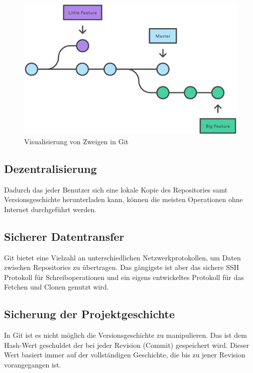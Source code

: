 \begin{figure}[!b]
	\begin{center}
		\includegraphics[width=16cm]{images/Git-Branches-1.png}
		\caption{Visualisierung von Zweigen in Git ~\cite{GitBranches}}
	\end{center}
\end{figure}
\newpage
\subsection*{Dezentralisierung}
Dadurch das jeder Benutzer sich eine lokale Kopie des Repositories samt Versionsgeschichte herunterladen kann, können die meisten Operationen ohne Internet durchgeführt werden. 

\subsection*{Sicherer Datentransfer}
Git bietet eine Vielzahl an unterschiedlichen Netzwerkprotokollen, um Daten zwischen Repositories zu übertragen. Das gängigste ist aber das sichere SSH Protokoll für Schreiboperationen und ein eigens entwickeltes Protokoll für das Fetchen und Clonen genutzt wird.

\subsection*{Sicherung der Projektgeschichte}
In Git ist es nicht möglich die Versionsgeschichte zu manipulieren. Das ist dem Hash-Wert geschuldet der bei jeder Revision (Commit) gespeichert wird. Dieser Wert basiert immer auf der vollständigen Geschichte, die bis zu jener Revision vorangegangen ist. 


